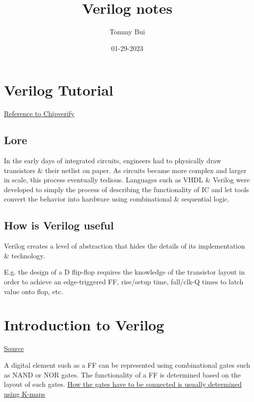 \documentclass{article}
\title{Verilog notes}
\date{01-29-2023}
\author{Tommy Bui}
\begin{document}
	\maketitle
	\newpage

	\tableofcontents
	\newpage

	\section{Verilog Tutorial}

	\href{https://www.chipverify.com/verilog/verilog-tutorial}{Reference to Chipverify} \newline

	\subsection{Lore}
	In the early days of integrated circuits, engineers had to physically draw transistors \& their netlist on paper. As circuits became more complex and larger in scale, this process eventually tedious. Languages such as VHDL \& Verilog were developed to simply the process of describing the functionality of IC and let tools convert the behavior into hardware using combinational \& sequential logic. \newline

	\subsection{How is Verilog useful}
	Verilog creates a level of abstraction that hides the details of its implementation \& technology. \newline

	E.g. the design of a D flip-flop requires the knowledge of the transistor layout in order to achieve an edge-triggered FF, rise/setup time, fall/clk-Q times to latch value onto flop, etc.

	\section{Introduction to Verilog}
	\href{https://www.chipverify.com/verilog/verilog-introduction}{Source}

	A digital element such as a FF can be represented using combinational gates such as NAND or NOR gates. The functionality of a FF is determined based on the layout of such gates. \underline{How the gates have to be connected is usually determined using K-maps} \newline
\end{document}
